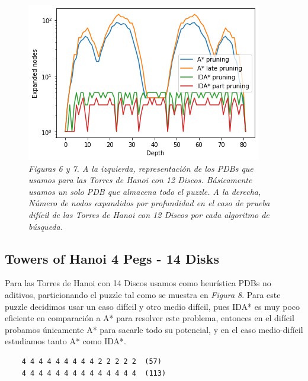 \documentclass[a4paper,10pt]{article}
\begin{document}
\begin{figure}[t!]
      \includegraphics[scale=0.4]{hanois12D/hanois12D.png}
      \\
      \small{\textit{Figuras 6 y 7. A la izquierda, representaci\'on de los
      PDBs que usamos para las Torres de Hanoi con 12 Discos. B\'asicamente
      usamos un solo PDB que almacena todo el puzzle. A la derecha, N\'umero 
      de nodos expandidos por profundidad en el caso de prueba dif\'icil de
      las Torres de Hanoi con 12 Discos por cada algoritmo de b\'usqueda.}}
    \end{figure}
    
  \subsection{Towers of Hanoi 4 Pegs - 14 Disks}
    Para las Torres de Hanoi con 14 Discos usamos como heur\'istica PDBs no aditivos, 
    particionando el puzzle tal como se muestra en \textit{Figura 8}. Para este puzzle
    decidimos usar un caso dif\'icil y otro medio dif\'icil, pues IDA* es muy poco
    eficiente en comparaci\'on a A* para resolver este problema, entonces en el dif\'icil 
    probamos \'unicamente A* para sacarle todo su potencial, y en el caso medio-dif\'icil 
    estudiamos tanto A* como IDA*.
    
    \begin{verbatim}
    4 4 4 4 4 4 4 4 4 2 2 2 2 2  (57)
    4 4 4 4 4 4 4 4 4 4 4 4 4 4  (113)
    \end{verbatim}
    
\end{document}
